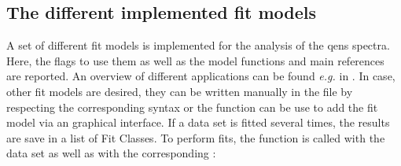 \subsection{The different implemented fit models}
	A set of different fit models is implemented for the analysis of the \gls{qens} spectra. Here, the flags to use them as well as the model functions and main references are reported. An overview of different applications can be found \textit{e.g.} in \cite{Grimaldo_2019_QuartRevBiophys}. In case, other fit models are desired, they can be written manually in the file  by respecting the corresponding syntax or the function  can be use to add the fit model via an graphical interface. If a data set is fitted several times, the results are save in a list of Fit Classes. To perform fits, the function  is called with the data set as well as with the corresponding :
